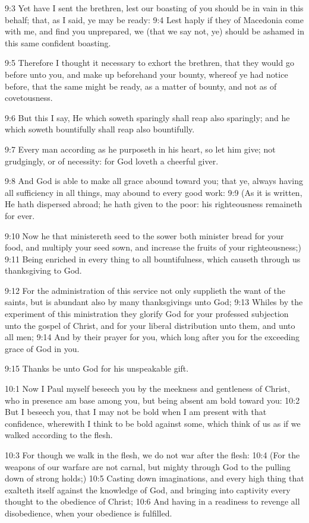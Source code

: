 9:3 Yet have I sent the brethren, lest our boasting of you should be in vain in this behalf; that, as I said, ye may be ready: 9:4 Lest haply if they of Macedonia come with me, and find you unprepared, we (that we say not, ye) should be ashamed in this same confident boasting.

9:5 Therefore I thought it necessary to exhort the brethren, that they would go before unto you, and make up beforehand your bounty, whereof ye had notice before, that the same might be ready, as a matter of bounty, and not as of covetousness.

9:6 But this I say, He which soweth sparingly shall reap also sparingly; and he which soweth bountifully shall reap also bountifully.

9:7 Every man according as he purposeth in his heart, so let him give; not grudgingly, or of necessity: for God loveth a cheerful giver.

9:8 And God is able to make all grace abound toward you; that ye, always having all sufficiency in all things, may abound to every good work: 9:9 (As it is written, He hath dispersed abroad; he hath given to the poor: his righteousness remaineth for ever.

9:10 Now he that ministereth seed to the sower both minister bread for your food, and multiply your seed sown, and increase the fruits of your righteousness;) 9:11 Being enriched in every thing to all bountifulness, which causeth through us thanksgiving to God.

9:12 For the administration of this service not only supplieth the want of the saints, but is abundant also by many thanksgivings unto God; 9:13 Whiles by the experiment of this ministration they glorify God for your professed subjection unto the gospel of Christ, and for your liberal distribution unto them, and unto all men; 9:14 And by their prayer for you, which long after you for the exceeding grace of God in you.

9:15 Thanks be unto God for his unspeakable gift.

10:1 Now I Paul myself beseech you by the meekness and gentleness of Christ, who in presence am base among you, but being absent am bold toward you: 10:2 But I beseech you, that I may not be bold when I am present with that confidence, wherewith I think to be bold against some, which think of us as if we walked according to the flesh.

10:3 For though we walk in the flesh, we do not war after the flesh: 10:4 (For the weapons of our warfare are not carnal, but mighty through God to the pulling down of strong holds;) 10:5 Casting down imaginations, and every high thing that exalteth itself against the knowledge of God, and bringing into captivity every thought to the obedience of Christ; 10:6 And having in a readiness to revenge all disobedience, when your obedience is fulfilled.

